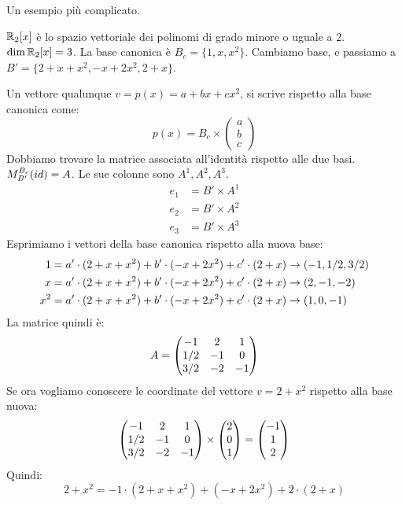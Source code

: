 \begin{exmp}
Un esempio pi\`u complicato.

$\mathbb{R}_2[x]$ \`e lo spazio vettoriale dei polinomi di grado minore o uguale a 2. $\dim \mathbb{R}_2[x] = 3$. La base canonica \`e $B_c = \{ 1, x, x^2 \}$. Cambiamo base, e passiamo a $B' = \{ 2 + x + x^2, -x + 2x^2, 2 + x\}$.

Un vettore qualunque $v = p(x) = a + b x + c x^2$, si scrive rispetto alla base canonica come:
\[
p(x) = B_c \times 
\begin{pmatrix}
a \\ b \\ c
\end{pmatrix}
\]
Dobbiamo trovare la matrice associata all'identit\`a rispetto alle due basi. $M_{B'}^{B_c} (id) = A$. Le sue colonne sono $A^1, A^2, A^3$.
\begin{align*}
e_1 &= B' \times A^1 \\
e_2 &= B' \times A^2 \\
e_3 &= B' \times A^3
\end{align*}
Esprimiamo i vettori della base canonica rispetto alla nuova base:
\begin{align*}
1 &= a' \cdot (2 + x + x^2) + b' \cdot (-x +2x^2) + c' \cdot (2 + x) \to (-1, {1}/{2}, {3}/{2}) \\
x &= a' \cdot (2 + x + x^2) + b' \cdot (-x +2x^2) + c' \cdot (2 + x) \to (2, -1, -2) \\
x^2 &= a' \cdot (2 + x + x^2) + b' \cdot (-x +2x^2) + c' \cdot (2 + x) \to (1, 0, -1)
\end{align*}
La matrice quindi \`e:
\[
A = 
\begin{pmatrix}
-1 & 2 & 1 \\
{1}/{2} & -1 & 0 \\
{3}/{2} & -2 & -1
\end{pmatrix}
\]
Se ora vogliamo conoscere le coordinate del vettore $v = 2 + x^2$ rispetto alla base nuova:
\[
\begin{pmatrix}
-1 & 2 & 1 \\
{1}/{2} & -1 & 0 \\
{3}/{2} & -2 & -1
\end{pmatrix}
\times
\begin{pmatrix}
2 \\ 0 \\ 1
\end{pmatrix} =
\begin{pmatrix}
-1 \\ 1 \\ 2
\end{pmatrix}
\]
Quindi:
\[
2 + x^2 = -1 \cdot (2 + x + x^2) + (-x + 2 x^2) + 2 \cdot (2 + x)
\]
\end{exmp}

